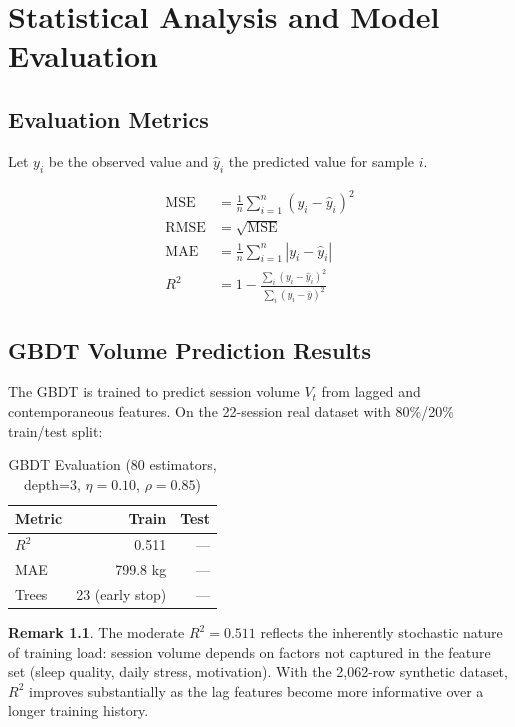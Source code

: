 \documentclass[12pt,a4paper]{report}
\theoremstyle{definition}
\newtheorem{remark}{Remark}[chapter]
\begin{document}
\chapter{Statistical Analysis and Model Evaluation}

\section{Evaluation Metrics}

Let $y_i$ be the observed value and $\hat{y}_i$ the predicted value for sample $i$.

\begin{align}
  \text{MSE}   &= \frac{1}{n}\sum_{i=1}^n (y_i - \hat{y}_i)^2 \\[6pt]
  \text{RMSE}  &= \sqrt{\text{MSE}} \\[6pt]
  \text{MAE}   &= \frac{1}{n}\sum_{i=1}^n |y_i - \hat{y}_i| \\[6pt]
  R^2          &= 1 - \frac{\sum_i (y_i - \hat{y}_i)^2}{\sum_i (y_i - \bar{y})^2}
\end{align}

\section{GBDT Volume Prediction Results}

The GBDT is trained to predict session volume $V_t$ from lagged and
contemporaneous features. On the 22-session real dataset with 80\%/20\%
train/test split:

\begin{table}[h!]
\centering
\caption{GBDT Evaluation (80 estimators, depth=3, $\eta=0.10$, $\rho=0.85$)}
\begin{tabular}{lrr}
\toprule
\textbf{Metric} & \textbf{Train} & \textbf{Test} \\
\midrule
$R^2$   & 0.511 & — \\
MAE     & 799.8 kg & — \\
Trees   & 23 (early stop) & — \\
\bottomrule
\end{tabular}
\end{table}

\begin{remark}
The moderate $R^2 = 0.511$ reflects the inherently stochastic nature of
training load: session volume depends on factors not captured in the feature
set (sleep quality, daily stress, motivation). With the 2{,}062-row synthetic
dataset, $R^2$ improves substantially as the lag features become more
informative over a longer training history.
\end{remark}
\end{document}
